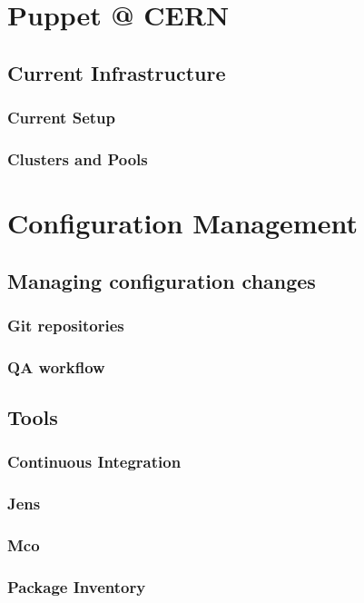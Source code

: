 \documentclass{beamer}
\begin{document}
\section{Puppet @ CERN}

\subsection{Current Infrastructure}
\begin{frame}
    \frametitle{Current Setup}
\end{frame}


\begin{frame}
    \frametitle{Clusters and Pools}
\end{frame}

\section{Configuration Management}

\subsection{Managing configuration changes}
\begin{frame}
    \frametitle{Git repositories}
\end{frame}


\begin{frame}
    \frametitle{QA workflow}
\end{frame}


\subsection{Tools}
\begin{frame}
    \frametitle{Continuous Integration}
\end{frame}


\begin{frame}
    \frametitle{Jens}
\end{frame}


\begin{frame}
    \frametitle{Mco}
\end{frame}


\begin{frame}
    \frametitle{Package Inventory}
\end{frame}

\end{document}
